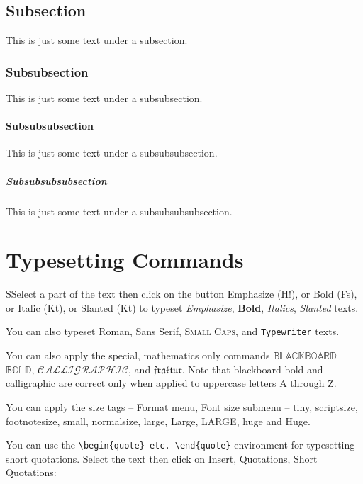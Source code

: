 \subsection{Subsection}

This is just some text under a subsection.

\subsubsection{Subsubsection}

This is just some text under a subsubsection.

\paragraph{Subsubsubsection}

This is just some  text under a subsubsubsection.

\subparagraph{Subsubsubsubsection}

This is just some text under a subsubsubsubsection.

\section{Typesetting Commands}

SSelect a part of the text then click on the button Emphasize (H!), or Bold (Fs), or
Italic (Kt), or Slanted (Kt) to typeset \emph{Emphasize}, \textbf{Bold},
\textit{Italics}, \textsl{Slanted} texts.

You can also typeset \textrm{Roman}, \textsf{Sans Serif}, \textsc{Small Caps}, and
\texttt{Typewriter} texts.

You can also apply the special, mathematics only commands $\mathbb{BLACKBOARD}$
$\mathbb{BOLD}$, $\mathcal{CALLIGRAPHIC}$, and $\mathfrak{fraktur}$. Note that
blackboard bold and calligraphic are correct only when applied to uppercase letters A
through Z.

You can apply the size tags -- Format menu, Font size submenu -- {\tiny tiny},
{\scriptsize scriptsize}, {\footnotesize footnotesize}, {\small small}, {\normalsize
normalsize}, {\large large}, {\Large Large}, {\LARGE LARGE}, {\huge huge} and {\Huge
Huge}.

You can use the \verb"\begin{quote} etc. \end{quote}" environment for typesetting
short quotations. Select the text then click on Insert, Quotations, Short Quotations:

